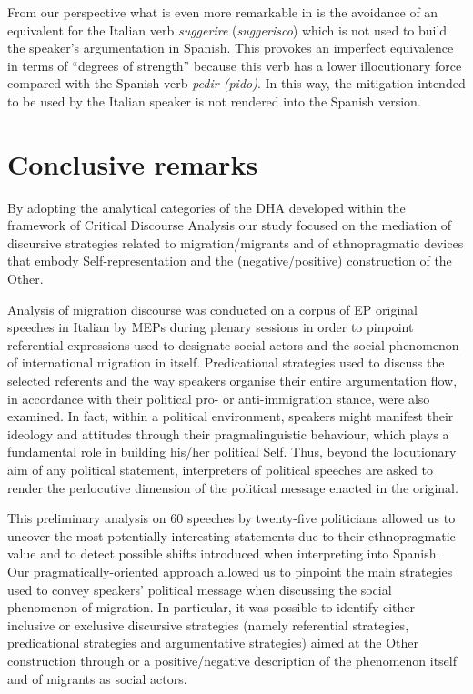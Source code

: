 \documentclass[output=paper]{langscibook}
\begin{document}
From our perspective what is even more remarkable in  is the avoidance of an equivalent for the Italian verb \textit{suggerire} (\textit{suggerisco}) which is not used to build the speaker’s argumentation in Spanish. This provokes an imperfect equivalence in terms of “degrees of strength” because this verb has a lower illocutionary force compared with the Spanish verb \textit{pedir (pido)}. In this way, the mitigation intended to be used by the Italian speaker is not rendered into the Spanish version.



\section{Conclusive remarks}\label{sec:mori:5}

By adopting the analytical categories of the DHA developed within the framework of Critical Discourse Analysis our study focused on the mediation of discursive strategies related to migration/migrants and of ethnopragmatic devices that embody Self-representation and the (negative/positive) construction of the Other.

Analysis of migration discourse was conducted on a corpus of EP original speeches in Italian by MEPs during plenary sessions in order to pinpoint referential expressions used to designate social actors and the social phenomenon of international migration in itself. Predicational strategies used to discuss the selected referents and the way speakers organise their entire argumentation flow, in accordance with their political pro- or anti-immigration stance, were also examined. In fact, within a political environment, speakers might manifest their ideology and attitudes through their pragmalinguistic behaviour, which plays a fundamental role in building his/her political Self. Thus, beyond the locutionary aim of any political statement, interpreters of political speeches are asked to render the perlocutive dimension of the political message enacted in the original.

This preliminary analysis on 60 speeches by twenty-five politicians allowed us to uncover the most potentially interesting statements due to their ethnopragmatic value and to detect possible shifts introduced when interpreting into Spanish. Our pragmatically-oriented approach allowed us to pinpoint the main strategies used to convey speakers’ political message when discussing the social phenomenon of migration. In particular, it was possible to identify either inclusive or exclusive discursive strategies (namely referential strategies, predicational strategies and argumentative strategies) aimed at the Other construction through or a positive/negative description of the phenomenon itself and of migrants as social actors.
\end{document}
